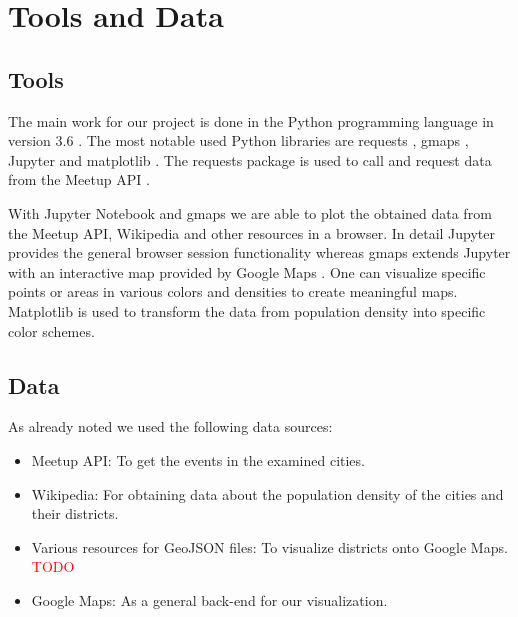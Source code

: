 \section{Tools and Data}\label{sec:toolsanddata}
\subsection{Tools} 
The main work for our project is done in the Python programming language in version 3.6 \cite{python}. The most notable used Python libraries are requests \cite{requests}, gmaps \cite{gmaps}, Jupyter \cite{jupyter} and matplotlib \cite{matplotlib}. The requests package is used to call and request data from the Meetup API \cite{meetupapi}. 

With Jupyter Notebook and gmaps we are able to plot the obtained data from the Meetup API, Wikipedia and other resources in a browser. In detail Jupyter provides the general browser session functionality whereas gmaps extends Jupyter with an interactive map provided by Google Maps \cite{googlemaps}. One can visualize specific points or areas in various colors and densities to create meaningful maps. 
Matplotlib is used to transform the data from population density into specific color schemes. 

\subsection{Data}

As already noted we used the following data sources: 

\begin{itemize}
\item Meetup API: To get the events in the examined cities. 
\item Wikipedia: For obtaining data about the population density of the cities and their districts. 
\item Various resources for GeoJSON files: To visualize districts onto Google Maps. \textcolor{red}{TODO}
\item Google Maps: As a general back-end for our visualization.  

\end{itemize}